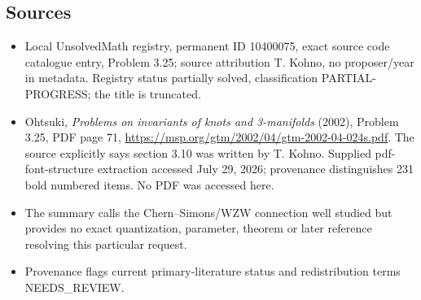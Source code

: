 \documentclass[11pt]{article}
\begin{document}
\subsection{Sources}
\begin{itemize}
\item Local UnsolvedMath registry, permanent ID 10400075, exact source code catalogue entry, Problem 3.25; source attribution T. Kohno, no proposer/year in metadata. Registry status partially solved, classification PARTIAL-PROGRESS; the title is truncated.
\item Ohtsuki, \emph{Problems on invariants of knots and 3-manifolds} (2002), Problem 3.25, PDF page 71, \url{https://msp.org/gtm/2002/04/gtm-2002-04-024s.pdf}. The source explicitly says section 3.10 was written by T. Kohno. Supplied pdf-font-structure extraction accessed July 29, 2026; provenance distinguishes 231 bold numbered items. No PDF was accessed here.
\item The summary calls the Chern--Simons/WZW connection well studied but provides no exact quantization, parameter, theorem or later reference resolving this particular request.
\item Provenance flags current primary-literature status and redistribution terms NEEDS\_REVIEW.
\end{itemize}
\end{document}
